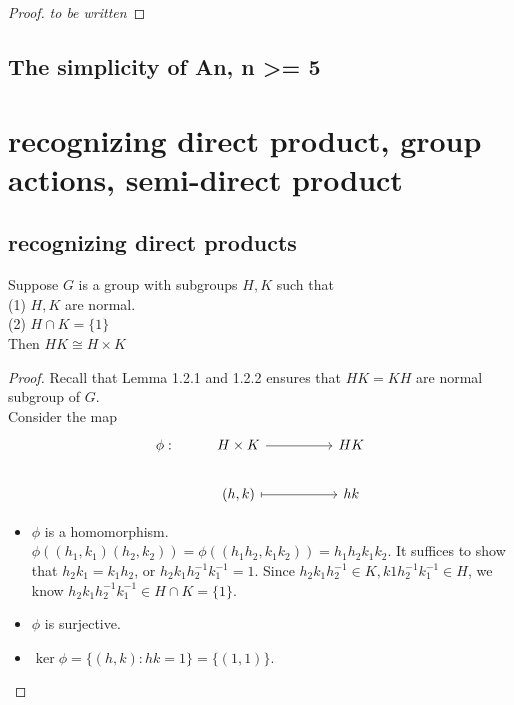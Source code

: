 \documentclass[11pt,fleqn]{book} %
\begin{document}
\begin{CJK}{UTF8}{gkai}
\begin{proof}
	{\it to be written}
\end{proof}

\subsection{The simplicity of An, n >= 5}

\begin{proposition}
	
\end{proposition}

\section{recognizing direct product, group actions, semi-direct product}
\subsection{recognizing direct products}
\begin{theorem}
	 Suppose $G$ is a group with subgroups $H, K$ such that \\
	(1) $H, K$ are normal. \\
	(2) $H \cap K = \{1\}$ \\
	Then $HK \cong H \times K$
\end{theorem}
\begin{proof}
	Recall that Lemma 1.2.1 and 1.2.2 ensures that $HK = KH$ are normal subgroup of $G$. \\
	Consider the map 
	\[\begin{tikzcd}
		{\phi:} & {H\times K} && HK \\
		& {(h,k)} && hk
		\arrow[from=1-2, to=1-4]
		\arrow[maps to, from=2-2, to=2-4]
	\end{tikzcd}\]
	\begin{itemize}
		\item $\phi$ is a homomorphism. $\phi((h_1,k_1)(h_2,k_2)) = \phi((h_1h_2,k_1k_2))=h_1h_2k_1k_2$. It suffices to show that $h_2k_1 = k_1h_2$, or $h_2k_1h_2^{-1}k_1^{-1} = 1$. Since $h_2k_1h_2^{-1} \in K, k1h_2^{-1}k_1^{-1}\in H$, we know $h_2k_1h_2^{-1}k_1^{-1}\in H \cap K = \{1\}$.
		\item $\phi$ is surjective.
		\item $\ker \phi = \{(h,k) : hk = 1\} = \{(1,1)\}$.
	\end{itemize}
\end{proof}


\end{CJK}
\end{document}
